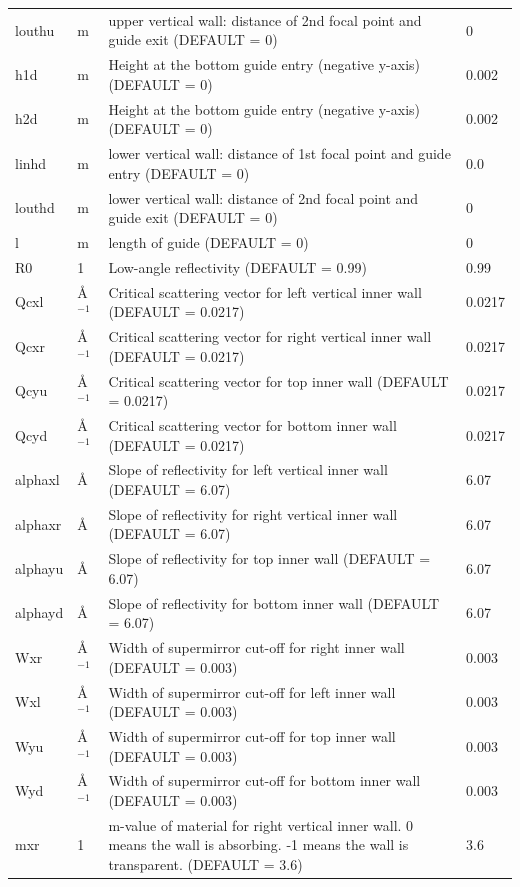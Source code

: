 \begin{longtable}{p{}p{}p{}p{}}
louthu & m & upper vertical wall: distance of 2nd focal point and guide exit (DEFAULT = 0) & 0 \\
h1d & m & Height at the bottom guide entry (negative y-axis) (DEFAULT = 0) & 0.002 \\
h2d & m & Height at the bottom guide entry (negative y-axis) (DEFAULT = 0) & 0.002 \\
linhd & m & lower vertical wall: distance of 1st focal point and guide entry (DEFAULT = 0) & 0.0 \\
louthd & m & lower vertical wall: distance of 2nd focal point and guide exit (DEFAULT = 0) & 0 \\
l & m & length of guide (DEFAULT = 0) & 0 \\
R0 & 1 & Low-angle reflectivity (DEFAULT = 0.99) & 0.99 \\
Qcxl & \AA{}$^{-1}$ & Critical scattering vector for left vertical inner wall (DEFAULT = 0.0217) & 0.0217 \\
Qcxr & \AA{}$^{-1}$ & Critical scattering vector for right vertical inner wall (DEFAULT = 0.0217) & 0.0217 \\
Qcyu & \AA{}$^{-1}$ & Critical scattering vector for top inner wall (DEFAULT = 0.0217) & 0.0217 \\
Qcyd & \AA{}$^{-1}$ & Critical scattering vector for bottom inner wall (DEFAULT = 0.0217) & 0.0217 \\
alphaxl & \AA{} & Slope of reflectivity for left vertical inner wall (DEFAULT = 6.07) & 6.07 \\
alphaxr & \AA{} & Slope of reflectivity for right vertical inner wall (DEFAULT = 6.07) & 6.07 \\
alphayu & \AA{} & Slope of reflectivity for top inner wall (DEFAULT = 6.07) & 6.07 \\
alphayd & \AA{} & Slope of reflectivity for bottom inner wall (DEFAULT = 6.07) & 6.07 \\
Wxr & \AA{}$^{-1}$ & Width of supermirror cut-off for right inner wall (DEFAULT = 0.003) & 0.003 \\
Wxl & \AA{}$^{-1}$ & Width of supermirror cut-off for left inner wall (DEFAULT = 0.003) & 0.003 \\
Wyu & \AA{}$^{-1}$ & Width of supermirror cut-off for top inner wall (DEFAULT = 0.003) & 0.003 \\
Wyd & \AA{}$^{-1}$ & Width of supermirror cut-off for bottom inner wall (DEFAULT = 0.003) & 0.003 \\
mxr & 1 & m-value of material for right vertical inner wall. 0 means the wall is absorbing. -1 means the wall is transparent. (DEFAULT = 3.6) & 3.6 \\

\end{longtable}
